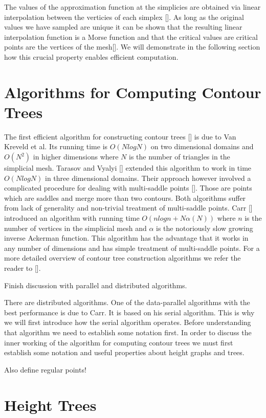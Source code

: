 The values of the approximation function at the simplicies are obtained via linear interpolation between the verticies of each simplex []. As long as the original values we have sampled are unique it can be shown that the resulting linear interpolation function is a Morse function and that the critical values are critical points are the vertices of the mesh[]. We will demonstrate in the following section how this crucial property enables efficient computation.

\section{Algorithms for Computing Contour Trees}

The first efficient algorithm for constructing contour trees [] is due to Van Kreveld et al. Its running time is $O(NlogN)$ on two dimensional domains and $O(N^2)$ in higher dimensions where $N$ is the number of triangles in the simplicial mesh. Tarasov and Vyalyi [] extended this algorithm to work in time $O(NlogN)$ in three dimensional domains. Their approach however involved a complicated procedure for dealing with multi-saddle points []. Those are points which are saddles and merge more than two contours. Both algorithms suffer from lack of generality and non-trivial treatment of multi-saddle points. Carr [] introduced an algorithm with running time $O(nlogn + N\alpha(N))$ where $n$ is the number of vertices in the simplicial mesh and $\alpha$ is the notoriously slow growing inverse Ackerman function. This algorithm has the advantage that it works in any number of dimensions and has simple treatment of multi-saddle points. For a more detailed overview of contour tree construction algorithms we refer the reader to [].


Finish discussion with parallel and distributed algorithms.

There are distributed algorithms. One of the data-parallel algorithms with the best performance is due to Carr. It is based on his serial algorithm. This is why we will first introduce how the serial algorithm operates. Before understanding that algorithm we need to establish some notation first. In order to discuss the inner working of the algorithm for computing contour trees we must first establish some notation and useful properties about height graphs and trees. 

Also define regular points!

\section{Height Trees}


